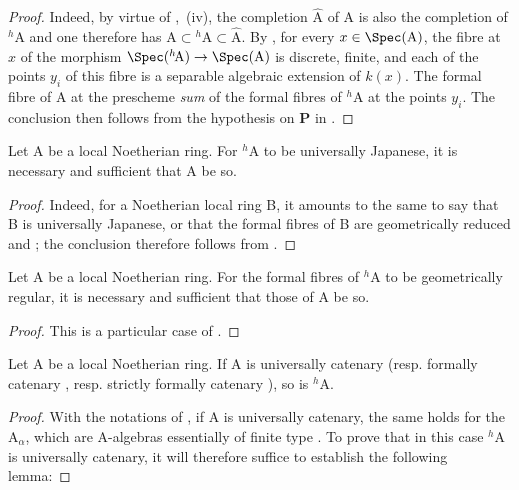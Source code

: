 \begin{proof}
Indeed, by virtue of ,~(iv), the completion $\hat{\mathrm{A}}$ of A is also the completion of ${}^h\!\mathrm{A}$ and one therefore has $\mathrm{A}\subset{}^h\!\mathrm{A}\subset\hat{\mathrm{A}}$.
By , for every $x\in\Spec(\mathrm{A})$, the fibre at $x$ of the morphism $\Spec({}^h\!\mathrm{A})\to\Spec(\mathrm{A})$ is discrete, finite, and each of the points $y_i$ of this fibre is a separable algebraic extension of $k(x)$.
The formal fibre of A at the prescheme \emph{sum} of the formal fibres of ${}^h\!\mathrm{A}$ at the points $y_i$.
The conclusion then follows from the hypothesis on $\boldsymbol{P}$ in .
\end{proof}

\begin{corollary}[18.7.3]
\label{IV.18.7.3}
Let $\mathrm{A}$ be a local Noetherian ring.
For ${}^h\!\mathrm{A}$ to be universally Japanese, it is necessary and sufficient that A be so.
\end{corollary}

\begin{proof}
Indeed, for a Noetherian local ring B, it amounts to the same to say that B is universally Japanese, or that the formal fibres of B are geometrically reduced  and ;
the conclusion therefore follows from .
\end{proof}

\begin{corollary}[18.7.4]
\label{IV.18.7.4}
Let $\mathrm{A}$ be a local Noetherian ring.
For the formal fibres of ${}^h\!\mathrm{A}$ to be geometrically regular, it is necessary and sufficient that those of A be so.
\end{corollary}

\begin{proof}
This is a particular case of .
\end{proof}

\begin{proposition}[18.7.5]
\label{IV.18.7.5}
Let $\mathrm{A}$ be a local Noetherian ring.
If A is universally catenary  (resp. formally catenary , resp. strictly formally catenary ), so is ${}^h\!\mathrm{A}$.
\end{proposition}

\begin{proof}
With the notations of , if A is universally catenary, the same holds for the $\mathrm{A}_\alpha$, which are A-algebras essentially of finite type .
To prove that in this case ${}^h\!\mathrm{A}$ is universally catenary, it will therefore suffice to establish the following lemma:
\end{proof}

